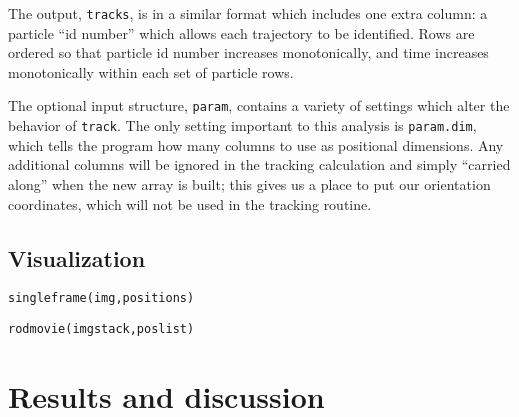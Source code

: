 The output, \texttt{tracks}, is in a similar format which includes one extra column: a particle ``id number'' which
allows each trajectory to be identified. Rows are ordered so that particle id number increases monotonically, and
time increases monotonically within each set of particle rows.

The optional input structure, \texttt{param}, contains a variety of settings which alter the behavior of 
\texttt{track}.  The only setting important to this analysis is \texttt{param.dim}, which tells the program how
many columns to use as positional dimensions. Any additional columns will be ignored in the tracking calculation and 
simply ``carried along'' when the new array is built; this gives us a place to put our orientation coordinates, which
will not be used in the tracking routine.

\subsection{Visualization}

\texttt{singleframe(img,positions)}

\texttt{rodmovie(imgstack,poslist)}

\section{Results and discussion}


